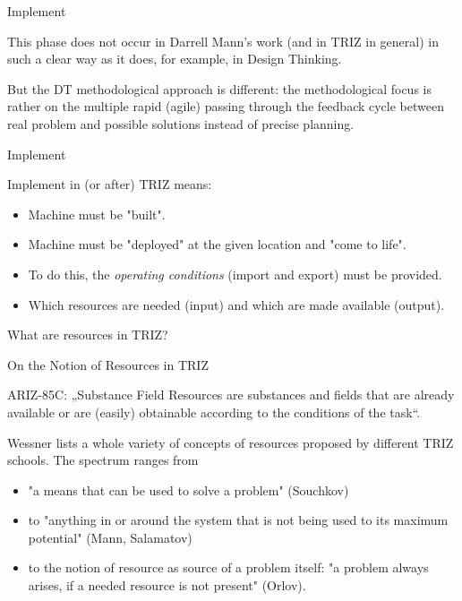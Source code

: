 \documentclass{beamer}
\begin{document}
\begin{frame}{Implement}

This phase does not occur in Darrell Mann's work (and in TRIZ in general) in
such a clear way as it does, for example, in Design Thinking.

But the DT methodological approach is different: the methodological focus is
rather on the multiple rapid (agile) passing through the feedback cycle
between real problem and possible solutions instead of precise planning.

\end{frame}

\begin{frame}{Implement}

Implement in (or after) TRIZ means: 
\begin{itemize}
\item Machine must be "built".
\item Machine must be "deployed" at the given location and "come to life".
\item To do this, the \emph{operating conditions} (import and export) must be
  provided.
\item Which resources are needed (input) and which are made available (output). 
\end{itemize}
\vfill

What are resources in TRIZ? 
\vfill
\end{frame}

\begin{frame}{On the Notion of Resources in TRIZ}

\begin{block}{ARIZ-85C:}
  „Substance Field Resources are substances and fields that are already
  available or are (easily) obtainable according to the conditions of the
  task“.
\end{block}
  
Wessner lists a whole variety of concepts of resources proposed by different
TRIZ schools.  The spectrum ranges from 
\begin{itemize}
\item "a means that can be used to solve a problem" (Souchkov) 
\item to "anything in or around the system that is not being used to its
  maximum potential" (Mann, Salamatov)
\item to the notion of resource as source of a problem itself: "a problem
  always arises, if a needed resource is not present" (Orlov).
\end{itemize}

\end{frame}
\end{document}
